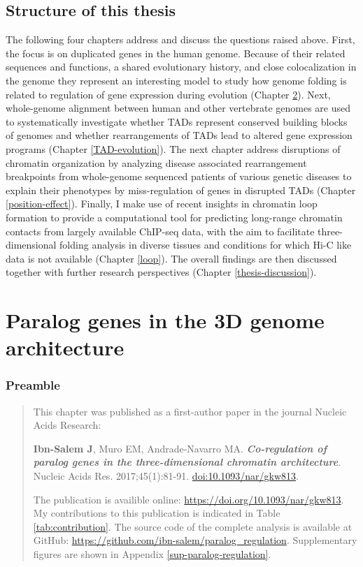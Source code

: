 \documentclass[a4paper,twoside=true,openright,parskip=full,chapterprefix=true,11pt,headings=normal,bibliography=totoc,listof=totoc,titlepage=on,captions=tableabove,draft=false]{scrreprt}
\theoremstyle{definition}
\theoremstyle{definition}
\theoremstyle{definition}
\theoremstyle{remark}
\begin{document}
\hypertarget{structure-of-this-thesis}{%
\section{Structure of this thesis}\label{structure-of-this-thesis}}

The following four chapters address and discuss the questions raised
above. First, the focus is on duplicated genes in the human genome.
Because of their related sequences and functions, a shared evolutionary
history, and close colocalization in the genome they represent an
interesting model to study how genome folding is related to regulation
of gene expression during evolution (Chapter \ref{paralog-regulation}).
Next, whole-genome alignment between human and other vertebrate genomes
are used to systematically investigate whether TADs represent conserved
building blocks of genomes and whether rearrangements of TADs lead to
altered gene expression programs (Chapter \ref{TAD-evolution}). The next
chapter address disruptions of chromatin organization by analyzing
disease associated rearrangement breakpoints from whole-genome sequenced
patients of various genetic diseases to explain their phenotypes by
miss-regulation of genes in disrupted TADs (Chapter
\ref{position-effect}). Finally, I make use of recent insights in
chromatin loop formation to provide a computational tool for predicting
long-range chromatin contacts from largely available ChIP-seq data, with
the aim to facilitate three-dimensional folding analysis in diverse
tissues and conditions for which Hi-C like data is not available
(Chapter \ref{loop}). The overall findings are then discussed together
with further research perspectives (Chapter \ref{thesis-discussion}).

\hypertarget{paralog-regulation}{%
\chapter{Paralog genes in the 3D genome
architecture}\label{paralog-regulation}}

\hypertarget{preamble}{%
\subsection*{Preamble}\label{preamble}}

\begin{quote}
This chapter was published as a first-author paper in the journal
Nucleic Acids Research:

\textbf{Ibn-Salem J}, Muro EM, Andrade-Navarro MA.
\textbf{\emph{Co-regulation of paralog genes in the three-dimensional
chromatin architecture}}. Nucleic Acids Res. 2017;45(1):81-91.
\href{https://doi.org/10.1093/nar/gkw813}{doi:10.1093/nar/gkw813}.

The publication is availible online:
\url{https://doi.org/10.1093/nar/gkw813}. My contributions to this
publication is indicated in Table \ref{tab:contribution}. The source
code of the complete analysis is available at GitHub:
\url{https://github.com/ibn-salem/paralog_regulation}. Supplementary
figures are shown in Appendix \ref{sup-paralog-regulation}.
\end{quote}
\end{document}
